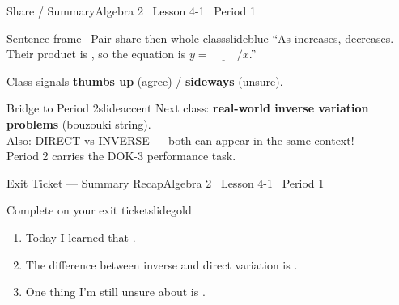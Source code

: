 \documentclass[aspectratio=169, 11pt]{beamer}
\begin{document}
\begin{frame}{Share / Summary}{Algebra 2 \textperiodcentered\ Lesson 4-1 \textperiodcentered\ Period 1}
\vspace{0.2cm}
\begin{projcard}{Sentence frame \textperiodcentered\ Pair share then whole class}{slideblue}
``As \underline{\hspace{1.2cm}} increases, \underline{\hspace{1.2cm}} decreases.
Their product is \underline{\hspace{1.2cm}}, so the equation is
\(y = \underline{\hspace{1cm}}/x\).''

\vspace{0.2cm}
Class signals \textbf{thumbs up} (agree) / \textbf{sideways} (unsure).
\end{projcard}

\vspace{0.15cm}
\begin{projcard}{Bridge to Period 2}{slideaccent}
Next class: \textbf{real-world inverse variation problems} (bouzouki string).\\
Also: DIRECT vs INVERSE --- both can appear in the same context!\\
Period 2 carries the DOK-3 performance task.
\end{projcard}
\end{frame}

\begin{frame}{Exit Ticket --- Summary Recap}{Algebra 2 \textperiodcentered\ Lesson 4-1 \textperiodcentered\ Period 1}
\vspace{0.2cm}
\begin{projcard}{Complete on your exit ticket}{slidegold}
\begin{enumerate}
  \setlength{\itemsep}{0.2cm}
  \item Today I learned that \underline{\hspace{5cm}}.
  \item The difference between inverse and direct variation is \underline{\hspace{4cm}}.
  \item One thing I'm still unsure about is \underline{\hspace{5cm}}.
\end{enumerate}
\end{projcard}
\end{frame}
\end{document}
